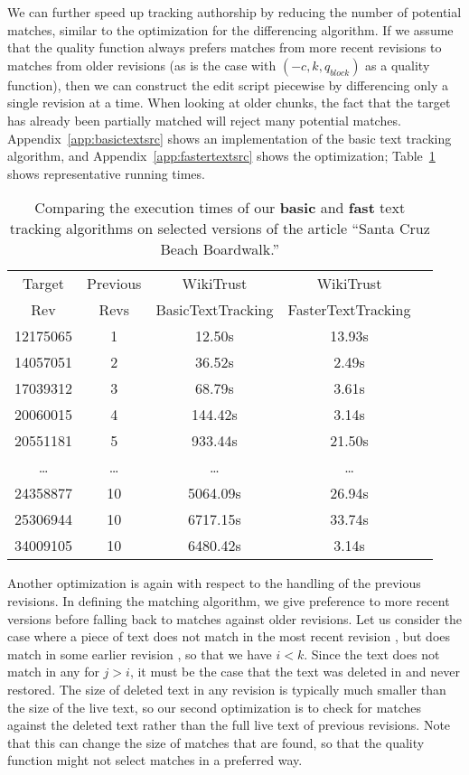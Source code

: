 We can further speed up tracking authorship by reducing the number
of potential matches, similar to the optimization for the differencing
algorithm.
If we assume that the quality function always prefers matches from
more recent revisions to matches from older revisions
(as is the case with $(-c, k, q_{block})$ as a quality function),
then we can construct the edit script piecewise by differencing
only a single revision at a time.
When looking at older chunks, the fact that the target has already
been partially matched will reject many potential matches.
Appendix~\ref{app:basictextsrc} shows an implementation of the
basic text tracking algorithm, and Appendix~\ref{app:fastertextsrc}
shows the optimization; Table~\ref{tab:comparetext} shows representative
running times.

\begin{table}
\begin{center}
\begin{tabular}{| c | c || c || c | c |}
\hline
Target & Previous & WikiTrust & WikiTrust \\
Rev & Revs & BasicTextTracking & FasterTextTracking \\
\hline
12175065 & 1 & 12.50s & 13.93s \\
14057051 & 2 & 36.52s & 2.49s \\
17039312 & 3 & 68.79s & 3.61s \\
20060015 & 4 & 144.42s & 3.14s \\
20551181 & 5 & 933.44s & 21.50s \\
\ldots & \ldots & \ldots & \ldots \\
24358877 & 10 & 5064.09s & 26.94s \\
25306944 & 10 & 6717.15s & 33.74s \\
34009105 & 10 & 6480.42s & 3.14s \\
\hline
\end{tabular}
\end{center}
\caption{Comparing the execution times of our
    \textbf{basic} and \textbf{fast} text tracking
    algorithms on selected versions of the article
    ``Santa Cruz Beach Boardwalk.''}
\label{tab:comparetext}
\end{table}


Another optimization is again with respect to the handling of the
previous revisions.
In defining the matching algorithm, we give preference to more recent
versions before falling back to matches against older revisions.
Let us consider the case where a piece of text does not match in the
most recent revision ,
but does match in some earlier revision , so that we have $i < k$.
Since the text does not match in any  for $j > i$,
it must be the case that the text was deleted in  and
never restored.
The size of deleted text in any revision is typically much smaller
than the size of the live text, so our second optimization is
to check for matches against the deleted text rather than the full
live text of previous revisions.
Note that this can change the size of matches that are found,
so that the quality function might not select matches in a preferred way.

